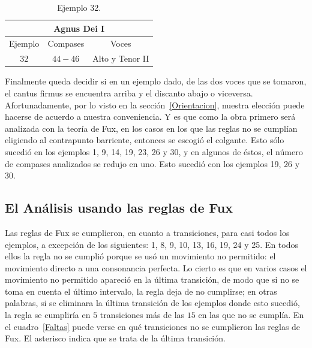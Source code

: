 \documentclass[letterpaper,12pt]{book}
\theoremstyle{definition} \newtheorem{Def}{Definición}[chapter]
\theoremstyle{definition} \newtheorem{Teo}{Teorema}[chapter]
\theoremstyle{definition} \newtheorem{Pro}{Proposición}[chapter]
\theoremstyle{definition} \newtheorem{Lema}{Lema}[chapter]
\begin{document}
\begin{table}[h]
\centering
\begin{tabular}{| c | c | c |}
\hline
\multicolumn{3}{|c|}{Agnus Dei I}\\
\hline
Ejemplo & Compases & Voces\\
\hline
$32$ & $44-46$ & Alto y Tenor II\\
\hline
\end{tabular}
\caption{\label{Agnus}Ejemplo 32.} 
\end{table}

Finalmente queda decidir si en un ejemplo dado, de las dos voces que se tomaron, el cantus firmus se encuentra arriba y el discanto abajo o viceversa. Afortunadamente, por lo visto en la sección~\ref{Orientacion}, nuestra elección puede hacerse de acuerdo a nuestra conveniencia. Y es que como la obra primero será analizada con la teoría de Fux, en los casos en los que las reglas no se cumplían eligiendo al contrapunto barriente, entonces se escogió el colgante. Esto sólo sucedió en los ejemplos 1, 9, 14, 19, 23, 26 y 30, y en algunos de éstos, el número de compases analizados se redujo en uno. Esto sucedió con los ejemplos 19, 26 y 30.   

\subsection{El Análisis usando las reglas de Fux}

Las reglas de Fux se cumplieron, en cuanto a transiciones, para casi todos los ejemplos, a excepción de los siguientes: 1, 8, 9, 10, 13, 16, 19, 24 y 25. En todos ellos la regla no se cumplió porque se usó un movimiento no permitido: el movimiento directo a una consonancia perfecta. Lo cierto es que en varios casos el movimiento no permitido apareció en la última transición, de modo que si no se toma en cuenta el último intervalo, la regla deja de no cumplirse; en otras palabras, si se eliminara la última transición de los ejemplos donde esto sucedió, la regla se cumpliría en $5$ transiciones más de las $15$ en las que no se cumplía. En el cuadro~\ref{Faltas} puede verse en qué transiciones no se cumplieron las reglas de Fux. El asterisco indica que se trata de la última transición.
\end{document}

